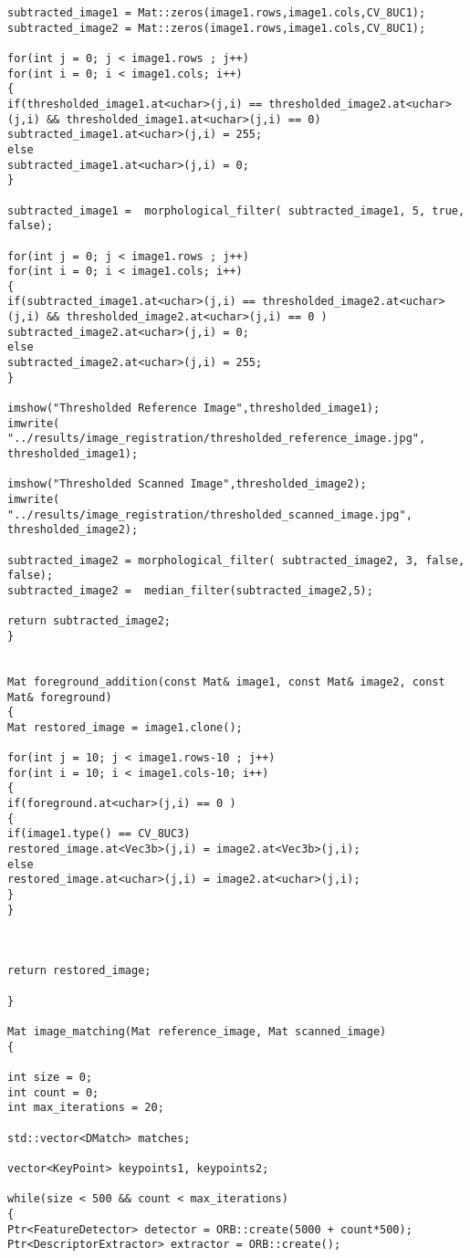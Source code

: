 \begin{lstlisting}
subtracted_image1 = Mat::zeros(image1.rows,image1.cols,CV_8UC1);
subtracted_image2 = Mat::zeros(image1.rows,image1.cols,CV_8UC1);

for(int j = 0; j < image1.rows ; j++)
for(int i = 0; i < image1.cols; i++)
{
if(thresholded_image1.at<uchar>(j,i) == thresholded_image2.at<uchar>(j,i) && thresholded_image1.at<uchar>(j,i) == 0)
subtracted_image1.at<uchar>(j,i) = 255;
else
subtracted_image1.at<uchar>(j,i) = 0;
}	

subtracted_image1 =  morphological_filter( subtracted_image1, 5, true, false);

for(int j = 0; j < image1.rows ; j++)
for(int i = 0; i < image1.cols; i++)
{
if(subtracted_image1.at<uchar>(j,i) == thresholded_image2.at<uchar>(j,i) && thresholded_image2.at<uchar>(j,i) == 0 )
subtracted_image2.at<uchar>(j,i) = 0;
else
subtracted_image2.at<uchar>(j,i) = 255;			
}

imshow("Thresholded Reference Image",thresholded_image1);
imwrite( "../results/image_registration/thresholded_reference_image.jpg", thresholded_image1);

imshow("Thresholded Scanned Image",thresholded_image2);
imwrite( "../results/image_registration/thresholded_scanned_image.jpg", thresholded_image2);

subtracted_image2 = morphological_filter( subtracted_image2, 3, false, false);
subtracted_image2 =  median_filter(subtracted_image2,5);

return subtracted_image2;
}


Mat foreground_addition(const Mat& image1, const Mat& image2, const Mat& foreground)
{
Mat restored_image = image1.clone();

for(int j = 10; j < image1.rows-10 ; j++)
for(int i = 10; i < image1.cols-10; i++)
{
if(foreground.at<uchar>(j,i) == 0 )
{
if(image1.type() == CV_8UC3)
restored_image.at<Vec3b>(j,i) = image2.at<Vec3b>(j,i);
else
restored_image.at<uchar>(j,i) = image2.at<uchar>(j,i);
}
}



return restored_image;

}

Mat image_matching(Mat reference_image, Mat scanned_image)
{

int size = 0;
int count = 0;
int max_iterations = 20;

std::vector<DMatch> matches;

vector<KeyPoint> keypoints1, keypoints2;

while(size < 500 && count < max_iterations)
{
Ptr<FeatureDetector> detector = ORB::create(5000 + count*500);
Ptr<DescriptorExtractor> extractor = ORB::create();


\end{lstlisting}
